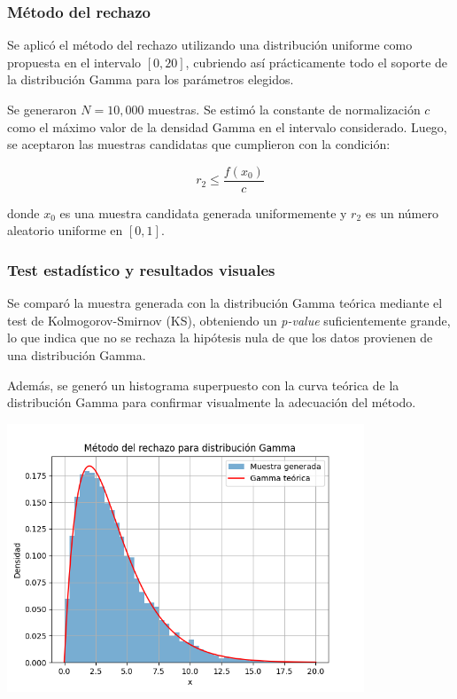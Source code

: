 \documentclass{article}
\begin{document}
\subsubsection{Método del rechazo}

Se aplicó el método del rechazo utilizando una distribución uniforme como propuesta en el intervalo $[0, 20]$, cubriendo así prácticamente todo el soporte de la distribución Gamma para los parámetros elegidos.

Se generaron $N = 10{,}000$ muestras. Se estimó la constante de normalización $c$ como el máximo valor de la densidad Gamma en el intervalo considerado. Luego, se aceptaron las muestras candidatas que cumplieron con la condición:

\[
r_2 \leq \frac{f(x_0)}{c}
\]

donde $x_0$ es una muestra candidata generada uniformemente y $r_2$ es un número aleatorio uniforme en $[0,1]$.

\subsubsection{Test estadístico y resultados visuales}

Se comparó la muestra generada con la distribución Gamma teórica mediante el test de Kolmogorov-Smirnov (KS), obteniendo un \textit{p-value} suficientemente grande, lo que indica que no se rechaza la hipótesis nula de que los datos provienen de una distribución Gamma.

Además, se generó un histograma superpuesto con la curva teórica de la distribución Gamma para confirmar visualmente la adecuación del método.

\begin{center}
    \includegraphics[width=0.8\textwidth]{visualizaciones/gamma_rechazo.png}
\end{center}
\end{document}
